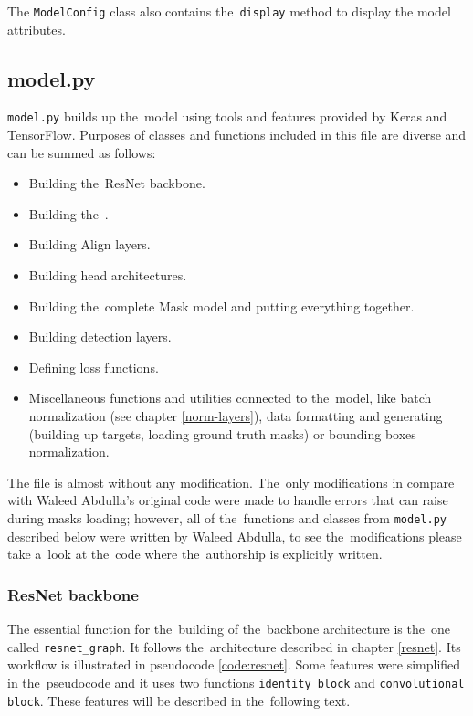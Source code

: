 The \verb|ModelConfig| class also contains the~\verb|display| method to display 
the model attributes.

\subsection{model.py}
\label{model}

\verb|model.py| builds up the~model using tools and features provided by Keras 
and TensorFlow. Purposes of classes and functions included in this file are 
diverse and can be summed as follows:
\begin{itemize}
	\item Building the~ResNet backbone.
	\item Building the~.
	\item Building Align layers.
	\item Building head architectures.
	\item Building the~complete Mask  model and putting everything together.
	\item Building detection layers.
	\item Defining loss functions.
	\item Miscellaneous functions and utilities connected to the~model, like batch normalization (see chapter \ref{norm-layers}), data formatting and generating (building up targets, loading ground truth masks) or bounding boxes normalization.
\end{itemize}

The file is almost without any modification. The~only modifications in compare 
with Waleed Abdulla's original code were made to handle errors that can raise 
during masks loading; however, all of the~functions and classes from 
\verb|model.py| described below were written by Waleed Abdulla, to see
the~modifications please take a~look at the~code where the~authorship is 
explicitly written.

\subsubsection{ResNet backbone}
\label{model-resnet}

The essential function for the~building of the~backbone architecture is
the~one called \verb|resnet_graph|. It follows the~architecture described in 
chapter \ref{resnet}. Its workflow is illustrated in pseudocode 
\ref{code:resnet}. Some features were simplified in the~pseudocode and it uses 
two functions \verb|identity_block| and \verb|convolutional block|. These 
features will be described in the~following text.

